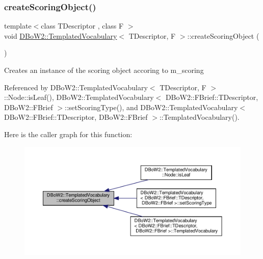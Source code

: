 \subsubsection{\texorpdfstring{create\+Scoring\+Object()}{createScoringObject()}}
{\footnotesize\ttfamily template$<$class T\+Descriptor , class F $>$ \\
void \hyperlink{classDBoW2_1_1TemplatedVocabulary}{D\+Bo\+W2\+::\+Templated\+Vocabulary}$<$ T\+Descriptor, F $>$\+::create\+Scoring\+Object (\begin{DoxyParamCaption}{ }\end{DoxyParamCaption})\hspace{0.3cm}{\ttfamily [protected]}}

Creates an instance of the scoring object accoring to m\+\_\+scoring 

Referenced by D\+Bo\+W2\+::\+Templated\+Vocabulary$<$ T\+Descriptor, F $>$\+::\+Node\+::is\+Leaf(), D\+Bo\+W2\+::\+Templated\+Vocabulary$<$ D\+Bo\+W2\+::\+F\+Brief\+::\+T\+Descriptor, D\+Bo\+W2\+::\+F\+Brief $>$\+::set\+Scoring\+Type(), and D\+Bo\+W2\+::\+Templated\+Vocabulary$<$ D\+Bo\+W2\+::\+F\+Brief\+::\+T\+Descriptor, D\+Bo\+W2\+::\+F\+Brief $>$\+::\+Templated\+Vocabulary().

Here is the caller graph for this function\+:\nopagebreak
\begin{figure}[H]
\begin{center}
\leavevmode
\includegraphics[width=350pt]{classDBoW2_1_1TemplatedVocabulary_a3244d5a3d0f75ba9c9ae905c5365335d_icgraph}
\end{center}
\end{figure}
\mbox{\label{classDBoW2_1_1TemplatedVocabulary_a9b74d107b7dc6142cbed4e6ef44a8519}} 
